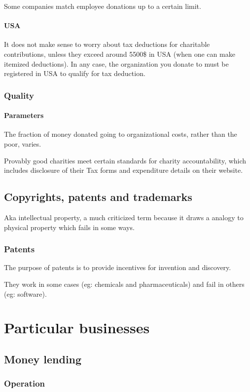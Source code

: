 \documentclass[oneside, article]{memoir}
\begin{document}
Some companies match employee donations up to a certain limit.

\subsection{USA}
It does not make sense to worry about tax deductions for charitable contributions, unless they exceed around 5500\$ in USA (when one can make itemized deductions). In any case, the organization you donate to must be registered in USA to qualify for tax deduction.


\section{Quality}
\subsection{Parameters}
The fraction of money donated going to organizational costs, rather than the poor, varies. 

Provably good charities meet certain standards for charity accountability, which includes disclosure of their Tax forms and expenditure details on their website.

\chapter{Copyrights, patents and trademarks}
Aka intellectual property, a much criticized term because it draws a analogy to physical property which fails in some ways.

\section{Patents}
The purpose of patents is to provide incentives for invention and discovery.

They work in some cases (eg: chemicals and pharmaceuticals) and fail in others (eg: software).


\tbc

\part{Particular businesses}
\chapter{Money lending}
\section{Operation}
\end{document}
